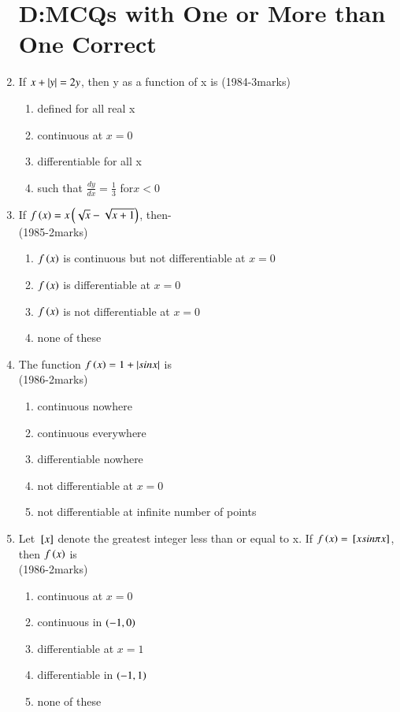 \documentclass[journal,12pt,twocolumn]{IEEEtran}
\theoremstyle{remark}
\begin{document}
\begin{enumerate}
\section{D:MCQs with One or More than One Correct}
\item If $x+\left\vert y\right\vert=2y$, then y as a function of x is
\hfill{(1984-3marks)} 
\begin{enumerate}[label=\alph*)]
    \item defined for all real x
    \item continuous at $x=0$
    \item differentiable for all x
    \item such that $\frac{dy}{dx}=\frac{1}{3}$ for$x<0$ \\
\end{enumerate}
\item If $f\left(x\right)=x\left(\sqrt{x}-\sqrt{x+1}\right)$, then- \\
\hfill{(1985-2marks)} 
\begin{enumerate}[label=\alph*)]
	\item $f\left(x\right)$ is continuous but not differentiable at $x=0$
	\item $f\left(x\right)$ is differentiable at $x=0$
	\item $f\left(x\right)$ is not differentiable at $x=0$
	\item none of these \\
\end{enumerate}
\item The function $f\left(x\right)=1+\left\vert sinx\right\vert$ is \\
\hfill{(1986-2marks)} 
\begin{enumerate}[label=\alph*)]
    \item continuous nowhere
    \item continuous everywhere
    \item differentiable nowhere 
    \item not differentiable at $x=0$
    \item not differentiable at infinite number of points \\
\end{enumerate} 
\item Let ${}\left[x\right]$ denote the greatest integer less than or equal to x. If $f\left(x\right)={}\left[xsin \pi x\right]$, then $f\left(x\right)$ is \\
\hfill{(1986-2marks)} 
\begin{enumerate}[label=\alph*)]
    \item continuous at $x=0$
    \item continuous in $\left(-1,0\right)$
    \item differentiable at $x=1$ 
    \item differentiable in $\left(-1,1\right)$ 
    \item none of these \\
\end{enumerate}


\end{enumerate}
\end{document}
